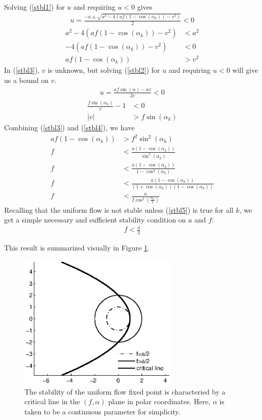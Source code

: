 \documentclass[10pt,twocolumn]{article}
\newcommand{\lm}{\fontfamily{\sfdefault}\selectfont}
\begin{document}
Solving (\ref{stbl1}) for $u$ and requiring $u<0$ gives
\begin{gather}
u = \frac{-a \pm \sqrt{a^2 - 4(af(1-\cos(\alpha_k))-v^2)}}{2} < 0
\end{gather}
\begin{align}
 a^2 - 4(af(1-\cos(\alpha_k))-v^2) &< a^2\\
 - 4(af(1-\cos(\alpha_k))-v^2) &< 0\\
\label{stbl3}  af(1-\cos(\alpha_k)) &> v^2
\end{align}
In (\ref{stbl3}), $v$ is unknown, but solving (\ref{stbl2}) for $u$ and requiring $u<0$ will give us a bound on $v$.
\begin{gather}
u = \frac{af\sin(\alpha)-av}{2v} < 0
\end{gather}
\begin{align}
 \frac{f\sin(\alpha_k)}{v} - 1 &< 0\\
\label{stbl4}  |v| &> f\sin(\alpha_k)
\end{align}
Combining (\ref{stbl3}) and (\ref{stbl4}), we have
\begin{align}
af(1-\cos(\alpha_k)) &> f^2\sin^2(\alpha_k)\\
 f &< \frac{a(1-\cos(\alpha_k))}{\sin^2(\alpha_k)}\\
 f &< \frac{a(1-\cos(\alpha_k))}{1-\cos^2(\alpha_k)}\\
 f &< \frac{a(1-\cos(\alpha_k))}{(1+\cos(\alpha_k))(1-\cos(\alpha_k))}\\
\label{stbl5}  f &< \frac{a}{2\cos^2(\frac{\alpha_k}{2})}
\end{align}
Recalling that the uniform flow is not stable unless (\ref{stbl5}) is true for all $k$, we get a simple necessary and sufficient stability condition on $a$ and $f$:
\begin{gather}
f < \frac{a}{2}
\end{gather}

This result is summarized visually in Figure \ref{fig:stblregion}.

\begin{figure}[!h]
\lm
\begin{center}
\includegraphics[width=3in]{stblregion}
\end{center}
\caption{ \label{fig:stblregion} The stability of the uniform flow fixed point is characteried by a critical line in the $(f,\alpha)$ plane in polar coordinates. Here, $\alpha$ is taken to be a continuous parameter for simplicity.}
\end{figure}
\end{document}
